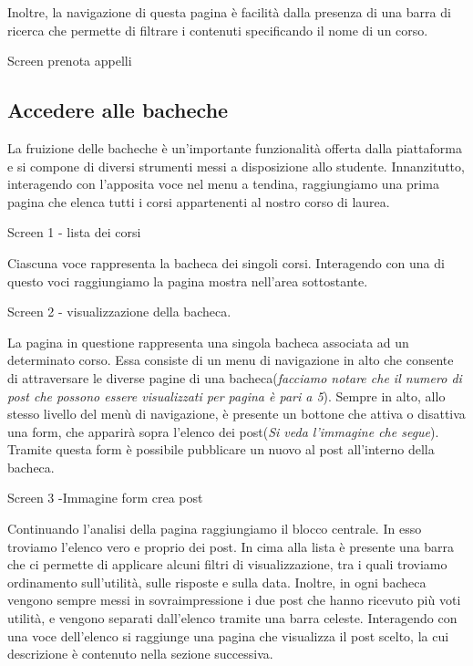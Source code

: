 \documentclass [a4paper,11pt]{book}
\begin{document}
Inoltre, la navigazione di questa pagina è facilità dalla presenza di una barra di ricerca che permette di filtrare i contenuti specificando il nome di un corso.

Screen prenota appelli

\medskip

\subsection{Accedere alle bacheche}

La fruizione delle bacheche è un'importante funzionalità offerta dalla piattaforma e si compone di diversi strumenti messi a disposizione allo studente.
Innanzitutto, interagendo con l'apposita voce nel menu a tendina, raggiungiamo una prima pagina che elenca tutti i corsi appartenenti al nostro corso di laurea.

Screen 1 - lista dei corsi

Ciascuna voce rappresenta la bacheca dei singoli corsi. Interagendo con una di questo voci raggiungiamo la pagina mostra nell'area sottostante.

Screen 2 - visualizzazione della bacheca.

La pagina in questione rappresenta una singola bacheca associata ad un determinato corso. Essa consiste di un menu di navigazione in alto che consente di attraversare le diverse pagine di una bacheca(\emph{facciamo notare che il numero di post che possono essere visualizzati per pagina è pari a 5}). Sempre in alto, allo stesso livello del menù di navigazione, è presente un bottone che  attiva o disattiva una form, che apparirà sopra l'elenco dei post(\emph{Si veda l'immagine che segue}). Tramite questa form è possibile pubblicare un nuovo al post all'interno della bacheca.

Screen 3 -Immagine form crea post

Continuando l'analisi della pagina raggiungiamo il blocco centrale. In esso troviamo l'elenco vero e proprio dei post. In cima alla lista è presente una barra che ci permette di applicare alcuni filtri di visualizzazione, tra i quali troviamo ordinamento sull'utilità, sulle risposte e sulla data. Inoltre, in ogni bacheca vengono sempre messi in sovraimpressione i due post che hanno ricevuto più voti utilità, e vengono separati dall'elenco tramite una barra celeste. Interagendo con una voce dell'elenco si raggiunge una pagina che visualizza il post scelto, la cui descrizione è contenuto nella sezione successiva.
\end{document}
